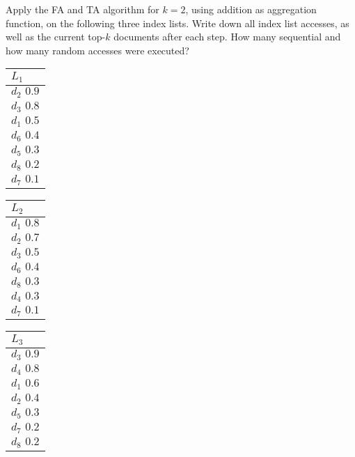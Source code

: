 Apply the FA and TA algorithm for $k=2$, using addition as aggregation function, on the following three index lists.
 Write down all index list accesses, as well as the current top-$k$ documents after each step.
 How many sequential and how many random accesses were executed?

  \begin{table}[h]
    \begin{center}
      \begin{minipage}[t]{2cm}
        \begin{tabular}{|p{25pt}|}\hline
          $L_1$\\\hline
          $d_2 \, \, 0.9$\\\hline
          $d_3 \, \, 0.8$\\\hline
          $d_1 \, \, 0.5$\\\hline
          $d_6 \, \, 0.4$\\\hline
          $d_5 \, \, 0.3$\\\hline
          $d_8 \, \, 0.2$\\\hline
          $d_7 \, \, 0.1$\\\hline
        \end{tabular}
      \end{minipage}
      \hspace{5mm}
      \begin{minipage}[t]{2cm}
        \begin{tabular}{|p{25pt}|}\hline
          $L_2$\\\hline
          $d_1 \, \, 0.8$\\\hline
          $d_2 \, \, 0.7$\\\hline
          $d_3 \, \, 0.5$\\\hline
          $d_6 \, \, 0.4$\\\hline
          $d_8 \, \, 0.3$\\\hline
          $d_4 \, \, 0.3$\\\hline
          $d_7 \, \, 0.1$\\\hline
        \end{tabular}
      \end{minipage}
      \hspace{5mm}
      \begin{minipage}[t]{2cm}
        \begin{tabular}{|p{25pt}|}\hline
          $L_3$\\\hline
          $d_3 \, \, 0.9$\\\hline
          $d_4 \, \, 0.8$\\\hline
          $d_1 \, \, 0.6$\\\hline
          $d_2 \, \, 0.4$\\\hline
          $d_5 \, \, 0.3$\\\hline
          $d_7 \, \, 0.2$\\\hline
          $d_8 \, \, 0.2$\\\hline
        \end{tabular}
      \end{minipage}
    \end{center}
  \end{table}

